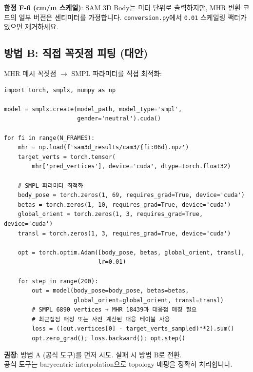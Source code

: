\documentclass[11pt, a4paper]{report}
\begin{document}
\begin{warningbox}
\textbf{함정 F-6 (cm/m 스케일)}: SAM 3D Body는 미터 단위로 출력하지만, MHR 변환 코드의 일부 버전은 센티미터를 가정합니다. \texttt{conversion.py}에서 \texttt{0.01} 스케일링 팩터가 있으면 제거하세요.
\end{warningbox}

\subsection{방법 B: 직접 꼭짓점 피팅 (대안)}

MHR 메시 꼭짓점 $\to$ SMPL 파라미터를 직접 최적화:

\begin{codebox}[title={MHR vertices $\to$ SMPL params 직접 피팅}]
\begin{verbatim}
import torch, smplx, numpy as np

model = smplx.create(model_path, model_type='smpl',
                     gender='neutral').cuda()

for fi in range(N_FRAMES):
    mhr = np.load(f'sam3d_results/cam3/{fi:06d}.npz')
    target_verts = torch.tensor(
        mhr['pred_vertices'], device='cuda', dtype=torch.float32)

    # SMPL 파라미터 최적화
    body_pose = torch.zeros(1, 69, requires_grad=True, device='cuda')
    betas = torch.zeros(1, 10, requires_grad=True, device='cuda')
    global_orient = torch.zeros(1, 3, requires_grad=True, device='cuda')
    transl = torch.zeros(1, 3, requires_grad=True, device='cuda')

    opt = torch.optim.Adam([body_pose, betas, global_orient, transl],
                           lr=0.01)

    for step in range(200):
        out = model(body_pose=body_pose, betas=betas,
                    global_orient=global_orient, transl=transl)
        # SMPL 6890 vertices → MHR 18439과 대응점 매칭 필요
        # 최근접점 매칭 또는 사전 계산된 대응 테이블 사용
        loss = ((out.vertices[0] - target_verts_sampled)**2).sum()
        opt.zero_grad(); loss.backward(); opt.step()
\end{verbatim}
\end{codebox}

\begin{importantnote}
\textbf{권장}: 방법 A (공식 도구)를 먼저 시도. 실패 시 방법 B로 전환.\\
공식 도구는 barycentric interpolation으로 topology 매핑을 정확히 처리합니다.
\end{importantnote}
\end{document}
